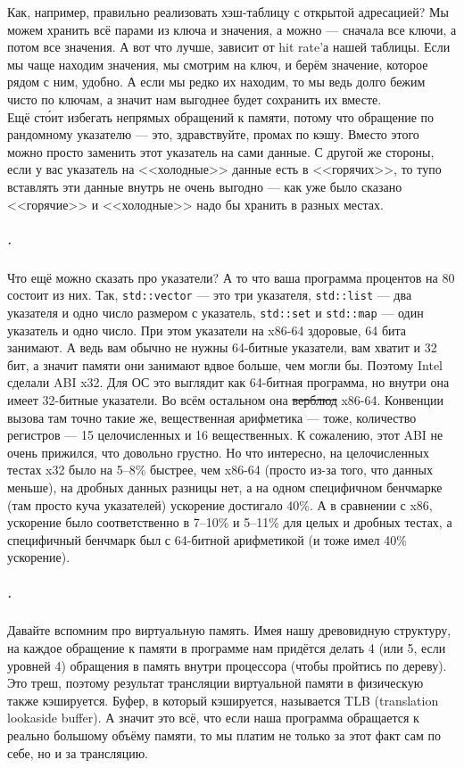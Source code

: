 \documentclass{article}
\begin{document}
    Как, например, правильно реализовать хэш-таблицу с открытой адресацией? Мы можем хранить всё парами из ключа и значения, а можно --- сначала все ключи, а потом все значения. А вот что лучше, зависит от hit rate'а нашей таблицы. Если мы чаще находим значения, мы смотрим на ключ, и берём значение, которое рядом с ним, удобно. А если мы редко их находим, то мы ведь долго бежим чисто по ключам, а значит нам выгоднее будет сохранить их вместе.\\
    Ещё ст\'{о}ит избегать непрямых обращений к памяти, потому что обращение по рандомному указателю --- это, здравствуйте, промах по кэшу. Вместо этого можно просто заменить этот указатель на сами данные. С другой же стороны, если у вас указатель на <<холодные>> данные есть в <<горячих>>, то тупо вставлять эти данные внутрь не очень выгодно --- как уже было сказано <<горячие>> и <<холодные>> надо бы хранить в разных местах.
    \subparagraph{.}
    Что ещё можно сказать про указатели? А то что ваша программа процентов на 80 состоит из них. Так, \texttt{std::vector} --- это три указателя, \texttt{std::list} --- два указателя и одно число размером с указатель, \texttt{std::set} и \texttt{std::map} --- один указатель и одно число. При этом указатели на x86-64 здоровые, 64 бита занимают. А ведь вам обычно не нужны 64-битные указатели, вам хватит и 32 бит, а значит памяти они занимают вдвое больше, чем могли бы. Поэтому Intel сделали ABI x32. Для ОС это выглядит как 64-битная программа, но внутри она имеет 32-битные указатели. Во всём остальном она \sout{верблюд} x86-64. Конвенции вызова там точно такие же, вещественная арифметика --- тоже, количество регистров --- 15 целочисленных и 16 вещественных. К сожалению, этот ABI не очень прижился, что довольно грустно. Но что интересно, на целочисленных тестах x32 было на 5--8\% быстрее, чем x86-64 (просто из-за того, что данных меньше), на дробных данных разницы нет, а на одном специфичном бенчмарке (там просто куча указателей) ускорение достигало 40\%. А в сравнении с x86, ускорение было соответственно в 7--10\% и 5--11\% для целых и дробных тестах, а специфичный бенчмарк был с 64-битной арифметикой (и тоже имел 40\% ускорение).
    \subparagraph{.}
    Давайте вспомним про виртуальную память. Имея нашу древовидную структуру, на каждое обращение к памяти в программе нам придётся делать 4 (или 5, если уровней 4) обращения в память внутри процессора (чтобы пройтись по дереву). Это треш, поэтому результат трансляции виртуальной памяти в физическую также кэшируется. Буфер, в который кэшируется, называется TLB (translation lookaside buffer). А значит это всё, что если наша программа обращается к реально большому объёму памяти, то мы платим не только за этот факт сам по себе, но и за трансляцию.\\
\end{document}
